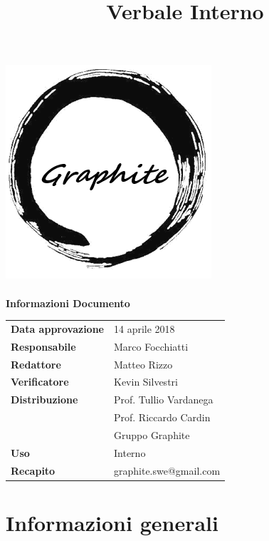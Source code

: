 \documentclass[openany,12pt,a4paper]{article}
\title{Verbale Interno}
\author{}
\begin{document}
 
  \makeatletter 
  \begin{titlepage} 
    \setlength{\headsep}{0pt}   
    \begin{center} 
      \includegraphics[width=0.5\linewidth]{Logo.png}\\[1em] 
      {\huge \bfseries  \@title }\\[10ex] 
      \textbf{\Large Informazioni Documento} \\[2em] 
      \bgroup 
      \def\arraystretch{1.5} 
      \begin{tabular}{l|l} 
        \textbf{Data approvazione} & 14 aprile 2018 \\ 
        \textbf{Responsabile} & Marco Focchiatti \\ 
        \textbf{Redattore} & Matteo Rizzo \\ 
        \textbf{Verificatore} & Kevin Silvestri \\ 
        \textbf{Distribuzione} & Prof. Tullio Vardanega \\ 
         & Prof. Riccardo Cardin \\ 
         & Gruppo Graphite \\ 
        \textbf{Uso} & Interno \\ 
        \textbf{Recapito} & graphite.swe@gmail.com \\ 
      \end{tabular} 
    \egroup 
    \end{center} 
  \end{titlepage} 
  \makeatother 
 
  \thispagestyle{empty} 
  \newpage 
   
  \tableofcontents 
  \newpage 
   
  \section{Informazioni generali} 
   
\end{document}
